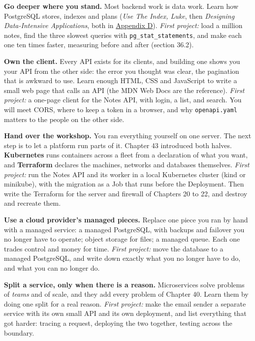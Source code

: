 \textbf{Go deeper where you stand.} Most backend work is data work. Learn how PostgreSQL stores, indexes and plans (\emph{Use The Index, Luke}, then \emph{Designing Data-Intensive Applications}, both in \hyperref[ch:44-appendices-4]{Appendix D}). \emph{First project:} load a million notes, find the three slowest queries with \texttt{pg\_stat\_statements}, and make each one ten times faster, measuring before and after (section 36.2).

\textbf{Own the client.} Every API exists for its clients, and building one shows you your API from the other side: the error you thought was clear, the pagination that is awkward to use. Learn enough HTML, CSS and JavaScript to write a small web page that calls an API (the MDN Web Docs are the reference). \emph{First project:} a one-page client for the Notes API, with login, a list, and search. You will meet CORS, where to keep a token in a browser, and why \texttt{openapi.yaml} matters to the people on the other side.

\textbf{Hand over the workshop.} You ran everything yourself on one server. The next step is to let a platform run parts of it. Chapter 43 introduced both halves. \textbf{Kubernetes} runs containers across a fleet from a declaration of what you want, and \textbf{Terraform} declares the machines, networks and databases themselves. \emph{First project:} run the Notes API and its worker in a local Kubernetes cluster (kind or minikube), with the migration as a Job that runs before the Deployment. Then write the Terraform for the server and firewall of Chapters 20 to 22, and destroy and recreate them.

\textbf{Use a cloud provider's managed pieces.} Replace one piece you ran by hand with a managed service: a managed PostgreSQL, with backups and failover you no longer have to operate; object storage for files; a managed queue. Each one trades control and money for time. \emph{First project:} move the database to a managed PostgreSQL, and write down exactly what you no longer have to do, and what you can no longer do.

\textbf{Split a service, only when there is a reason.} Microservices solve problems of \emph{teams} and of scale, and they add every problem of Chapter 40. Learn them by doing one split for a real reason. \emph{First project:} make the email sender a separate service with its own small API and its own deployment, and list everything that got harder: tracing a request, deploying the two together, testing across the boundary.

